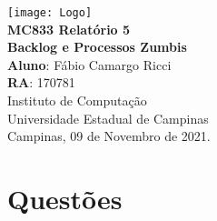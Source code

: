 \documentclass[12pt,a4paper]{report}
\begin{document}
\begin{titlepage}
    \begin{center}
        \vspace*{1cm}
        \texttt{[image: Logo]}\\
        \vspace{1.5cm}
        \Huge
    	\textbf{MC833 Relatório 5 \\
        Backlog e Processos Zumbis} \\
        \vspace{1.5cm}
        \Large
        \textbf{Aluno}: Fábio Camargo Ricci\\
        \textbf{RA}: 170781\\
        \vspace{1.2cm}
    	\Large 
    	Instituto de Computação\\
    	Universidade Estadual de Campinas\\
    	\vspace{1.5cm}
        Campinas, 09 de Novembro de 2021.
    \end{center}
\end{titlepage}
\tableofcontents
\clearpage

\newcommand{\shellcmd}[1]{\texttt{\footnotesize\# #1}}%

\section{Questões}
\end{document}
